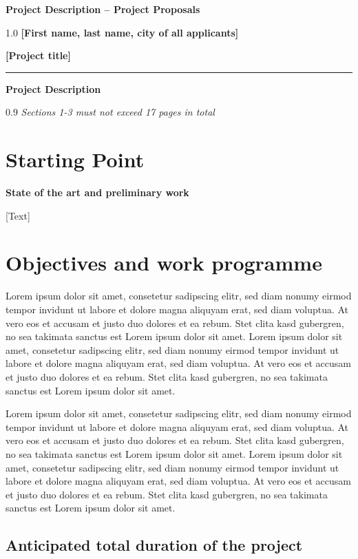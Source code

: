 \documentclass[a4paper,11pt]{article}
\newcommand{\heading}[1]{\textbf{#1}\par\medskip}
\newenvironment{headingblock}{\begin{spacing}{1.0}\bf}{\end{spacing}}
\newenvironment{comment}{\begin{spacing}{0.9}\footnotesize\it}{\end{spacing}}
\newcommand{\horizontalrule}{\rule{\textwidth}{0.4pt}}
\begin{document}
\heading{Project Description -- Project Proposals}

\begin{headingblock}
  [First name, last name, city of all applicants]
\end{headingblock}

\heading{[Project title]}

\horizontalrule

\heading{Project Description}

\begin{comment}
  Sections 1-3 must not exceed 17 pages in total
\end{comment}

\section{Starting Point}

\heading{State of the art and preliminary work}

[Text]

\section{Objectives and work programme}

Lorem ipsum dolor sit amet, consetetur sadipscing elitr, sed diam nonumy eirmod tempor invidunt ut labore et dolore magna aliquyam erat, sed diam voluptua. At vero eos et accusam et justo duo dolores et ea rebum. Stet clita kasd gubergren, no sea takimata sanctus est Lorem ipsum dolor sit amet. Lorem ipsum dolor sit amet, consetetur sadipscing elitr, sed diam nonumy eirmod tempor invidunt ut labore et dolore magna aliquyam erat, sed diam voluptua. At vero eos et accusam et justo duo dolores et ea rebum. Stet clita kasd gubergren, no sea takimata sanctus est Lorem ipsum dolor sit amet.

Lorem ipsum dolor sit amet, consetetur sadipscing elitr, sed diam nonumy eirmod tempor invidunt ut labore et dolore magna aliquyam erat, sed diam voluptua. At vero eos et accusam et justo duo dolores et ea rebum. Stet clita kasd gubergren, no sea takimata sanctus est Lorem ipsum dolor sit amet. Lorem ipsum dolor sit amet, consetetur sadipscing elitr, sed diam nonumy eirmod tempor invidunt ut labore et dolore magna aliquyam erat, sed diam voluptua. At vero eos et accusam et justo duo dolores et ea rebum. Stet clita kasd gubergren, no sea takimata sanctus est Lorem ipsum dolor sit amet.


\subsection{Anticipated total duration of the project}
\end{document}

